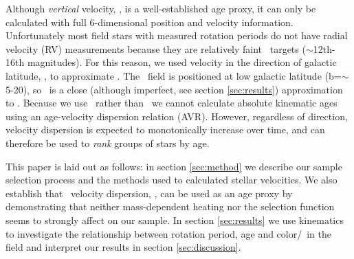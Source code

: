 Although {\it vertical} velocity, \vz, is a well-established age proxy, it can
only be calculated with full 6-dimensional position and velocity information.
Unfortunately most field stars with measured rotation periods do not have
radial velocity (RV) measurements because they are relatively faint \kepler\
targets ($\sim$12th-16th magnitudes).
For this reason, we used velocity in the direction of galactic latitude, \vb,
to approximate \vz.
The \kepler\ field is positioned at low galactic latitude
(b=$\sim$5-20\degrees), so \vb\ is a close (although imperfect, see section
\ref{sec:results}) approximation to \vz.
Because we use \vb\ rather than \vz\, we cannot calculate absolute kinematic
ages using an age-velocity dispersion relation (AVR).
However, regardless of direction, velocity dispersion is expected to
monotonically increase over time, and can therefore be used to {\it rank}
groups of stars by age.

This paper is laid out as follows: in section \ref{sec:method} we describe our
sample selection process and the methods used to calculated stellar
velocities.
We also establish that \vb\ velocity dispersion, \sigmavb, can be used as an
age proxy by demonstrating that neither mass-dependent heating nor the
selection function seems to strongly affect on our sample.
In section \ref{sec:results} we use kinematics to investigate the
relationship between rotation period, age and color/\teff\ in the field and
interpret our results in section \ref{sec:discussion}.


